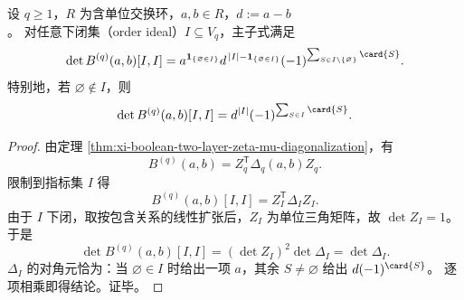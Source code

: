 \begin{theorem}[任意下闭主子式的精确行列式]\label{thm:xi-boolean-two-layer-order-ideal-principal-minor}
设 \(q\ge 1\)，\(R\) 为含单位交换环，\(a,b\in R\)，\(d:=a-b\)。
对任意下闭集（order ideal）\(I\subseteq V_q\)，主子式满足
\[
\det B^{(q)}(a,b)[I,I]
=a^{\mathbf 1_{\{\varnothing\in I\}}}
d^{\,|I|-\mathbf 1_{\{\varnothing\in I\}}}
(-1)^{\sum_{S\in I\setminus\{\varnothing\}}\card{S}}.
\]
特别地，若 \(\varnothing\notin I\)，则
\[
\det B^{(q)}(a,b)[I,I]
=d^{|I|}(-1)^{\sum_{S\in I}\card{S}}.
\]
\end{theorem}
\begin{proof}
由定理 \ref{thm:xi-boolean-two-layer-zeta-mu-diagonalization}，有
\[
B^{(q)}(a,b)=Z_q^{\mathsf T}\Delta_q(a,b)Z_q.
\]
限制到指标集 \(I\) 得
\[
B^{(q)}(a,b)[I,I]=Z_I^{\mathsf T}\Delta_I Z_I.
\]
由于 \(I\) 下闭，取按包含关系的线性扩张后，\(Z_I\) 为单位三角矩阵，故 \(\det Z_I=1\)。
于是
\[
\det B^{(q)}(a,b)[I,I]
=(\det Z_I)^2\det\Delta_I
=\det\Delta_I.
\]
\(\Delta_I\) 的对角元恰为：当 \(\varnothing\in I\) 时给出一项 \(a\)，其余 \(S\neq\varnothing\) 给出 \(d(-1)^{\card{S}}\)。
逐项相乘即得结论。证毕。
\end{proof}


